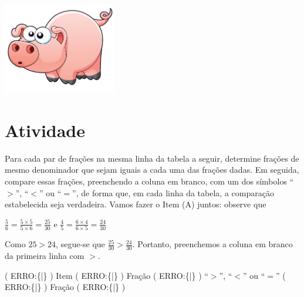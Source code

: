 \documentclass[a4,12pt]{book}
\begin{document}
\includegraphics[width=\textwidth,height=4cm, keepaspectratio]{pig}
\section{Atividade}







Para cada par de frações na mesma linha da tabela a seguir, determine frações de mesmo denominador que sejam iguais a cada uma das frações dadas. Em seguida, compare essas frações, preenchendo a coluna em branco, com um dos símbolos ``$>$'', ``$<$'' ou ``$=$'', de forma que, em cada linha da tabela, a comparação estabelecida seja verdadeira. Vamos fazer o Item (A) juntos: observe que

$\frac{5}{6} = \frac{5 \times 5}{5 \times 6} = \frac{25}{30}$ e $\frac{4}{5} = \frac{6 \times 4}{6 \times 5} = \frac{24}{30}$

Como $25 > 24$, segue-se que $\frac{25}{30} > \frac{24}{30}$. Portanto, preenchemos a coluna em branco da primeira linha com $>$.

( ERRO:\{|\} ) Item ( ERRO:\{|\} ) Fração ( ERRO:\{|\} ) ``$>$'', ``$<$'' ou ``$=$'' ( ERRO:\{|\} ) Fração ( ERRO:\{|\} ) 
\end{document}
